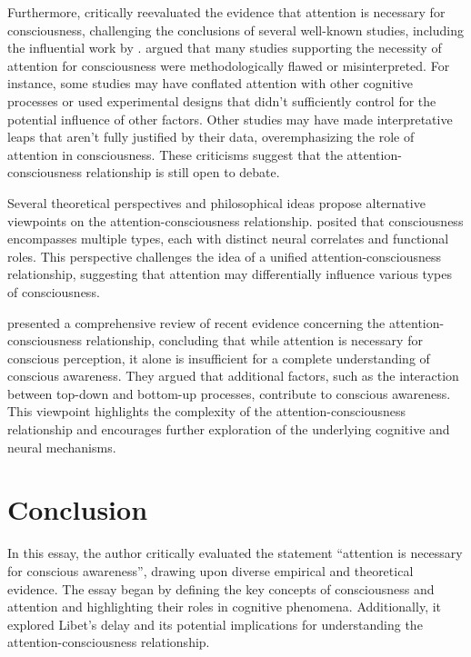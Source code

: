 \documentclass[10pt]{article}
\begin{document}
\begin{sloppypar}
  Furthermore, \cite{kozuch_gorillas_2018} critically reevaluated the evidence that attention is necessary for consciousness, challenging the conclusions of several well-known studies, including the influential work by \cite{cohen_attentional_2012}. \citeauthor*{kozuch_gorillas_2018} argued that many studies supporting the necessity of attention for consciousness were methodologically flawed or misinterpreted. For instance, some studies may have conflated attention with other cognitive processes or used experimental designs that didn't sufficiently control for the potential influence of other factors. Other studies may have made interpretative leaps that aren't fully justified by their data, overemphasizing the role of attention in consciousness. These criticisms suggest that the attention-consciousness relationship is still open to debate.


  Several theoretical perspectives and philosophical ideas propose alternative viewpoints on the attention-consciousness relationship. \cite{montemayor_types_2021} posited that consciousness encompasses multiple types, each with distinct neural correlates and functional roles. This perspective challenges the idea of a unified attention-consciousness relationship, suggesting that attention may differentially influence various types of consciousness.

  \cite{noah_recent_2020} presented a comprehensive review of recent evidence concerning the attention-consciousness relationship, concluding that while attention is necessary for conscious perception, it alone is insufficient for a complete understanding of conscious awareness. They argued that additional factors, such as the interaction between top-down and bottom-up processes, contribute to conscious awareness. This viewpoint highlights the complexity of the attention-consciousness relationship and encourages further exploration of the underlying cognitive and neural mechanisms.



  \section{Conclusion}
  \label{sec:conclusion}

  In this essay, the author critically evaluated the statement “attention is necessary for conscious awareness”, drawing upon diverse empirical and theoretical evidence. The essay began by defining the key concepts of consciousness and attention and highlighting their roles in cognitive phenomena. Additionally, it explored Libet’s delay and its potential implications for understanding the attention-consciousness relationship.


\end{sloppypar}
\end{document}
